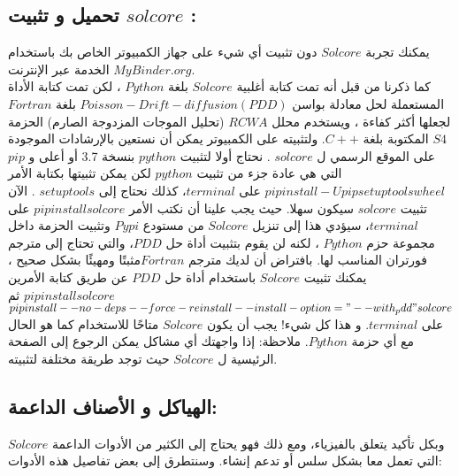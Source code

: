 \subsection{تحميل و تثبيت $ solcore $ :}
يمكنك تجربة $ Solcore $ دون تثبيت أي شيء على جهاز الكمبيوتر الخاص بك باستخدام الخدمة عبر الإنترنت $ MyBinder.org $. 
\\
كما ذكرنا من قبل أنه تمت كتابة أغلبية  $ Solcore $ بلغة $ Python $ ، لكن تمت كتابة الأداة المستعملة لحل معادلة بواسن  $ Poisson-Drift-diffusion (PDD) $ بلغة $ Fortran  $ لجعلها أكثر كفاءة ، ويستخدم محلل $ RCWA $ (تحليل الموجات المزدوجة الصارم) الحزمة $ S4 $ المكتوبة بلغة $ C ++ $. ولتثبيته على الكمبيوتر يمكن أن نستعين بالإرشادات الموجودة على الموقع الرسمي ل $ solcore $ . نحتاج أولا لتثبيت $ python  $ بنسخة 3.7 أو أعلى  و $ pip $ التي هي عادة جزء من تثبيت $ python  $ لكن يمكن تثبيتها بكتابة الأمر $ pip install -U pip setuptools wheel $ على $ terminal $، كذلك نحتاج إلى $ setuptools $ . الآن تثبيت $ solcore $ سيكون سهلا. حيث يجب علينا أن نكتب الأمر $ pip install solcore $ على $ terminal $، سيؤدي هذا إلى تنزيل $ Solcore $ من مستودع $ Pypi  $ وتثبيت الحزمة داخل مجموعة حزم $ Python $ ، لكنه لن يقوم بتثبيت أداة حل $ PDD  $، والتي تحتاج إلى مترجم فورتران المناسب لها. بافتراض أن لديك مترجم $ Fortran  $مثبتًا ومهيئًا بشكل صحيح ، يمكنك تثبيت $ Solcore $ باستخدام أداة حل $ PDD $ عن طريق كتابة الأمرين $ pip install solcore $ ثم $ pip install --no-deps --force-reinstall --install-option="--with_pdd" solcore $  على $ terminal $. و هذا كل شيء! يجب أن يكون $ Solcore $ متاحًا للاستخدام كما هو الحال مع أي حزمة $ Python $.
ملاحظة: إذا واجهتك أي مشاكل يمكن الرجوع إلى الصفحة الرئيسية ل $ Solcore $ حيث توجد طريقة مختلفة لتثبيته. 
\subsection{الهياكل و الأصناف الداعمة: }
$ Solcore $ وبكل تأكيد يتعلق بالفيزياء، ومع ذلك فهو يحتاج إلى الكثير من الأدوات الداعمة التي تعمل معا بشكل سلس أو تدعم إنشاء. وسنتطرق إلى بعض تفاصيل هذه الأدوات:
